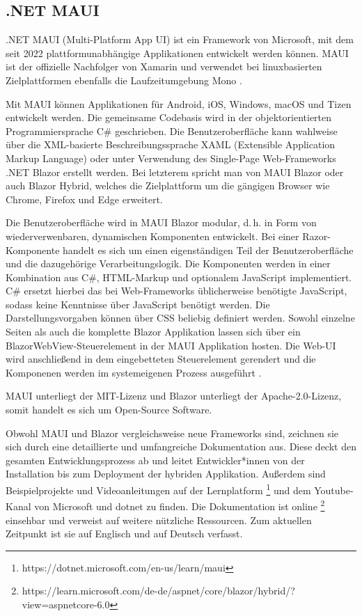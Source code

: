 \documentclass[]{lni}
\begin{document}
\subsection{.NET MAUI}\label{sec:MAUI}
.NET MAUI (Multi-Platform App UI) ist ein Framework von Microsoft, mit dem seit 2022 plattformunabhängige Applikationen entwickelt werden können. MAUI ist der offizielle Nachfolger von Xamarin und verwendet bei linuxbasierten Zielplattformen ebenfalls die Laufzeitumgebung Mono \cite{Davidbritch.04.12.2022c}. 

Mit MAUI können Applikationen für Android, iOS, Windows, macOS und Tizen entwickelt werden. Die gemeinsame Codebasis wird in der objektorientierten Programmiersprache C\# geschrieben. Die Benutzeroberfläche kann wahlweise über die XML-basierte Beschreibungssprache XAML (Extensible Application Markup Language) oder unter Verwendung des Single-Page Web-Frameworks .NET Blazor erstellt werden. Bei letzterem spricht man von MAUI Blazor oder auch Blazor Hybrid, welches die Zielplattform um die gängigen Browser wie Chrome, Firefox und Edge erweitert.

Die Benutzeroberfläche wird in MAUI Blazor modular, d.\,h. in Form von wiederverwenbaren, dynamischen Komponenten entwickelt. Bei einer Razor-Komponente handelt es sich um einen eigenständigen Teil der Benutzeroberfläche und die dazugehörige Verarbeitungslogik. Die Komponenten werden in einer Kombination aus C\#, HTML-Markup und optionalem JavaScript implementiert. C\# ersetzt hierbei das bei Web-Frameworks üblicherweise benötigte JavaScript, sodass keine Kenntnisse über JavaScript benötigt werden. Die Darstellungsvorgaben können über CSS beliebig definiert werden. Sowohl einzelne Seiten als auch die komplette Blazor Applikation lassen sich über ein BlazorWebView-Steuerelement in der MAUI Applikation hosten. Die Web-UI wird anschließend in dem eingebetteten Steuerelement gerendert und die Komponenen werden im systemeigenen Prozess ausgeführt \cite{Davidbritch.04.12.2022}.

MAUI unterliegt der MIT-Lizenz und Blazor unterliegt der Apache-2.0-Lizenz, somit handelt es sich um Open-Source Software.

Obwohl MAUI und Blazor vergleichsweise neue Frameworks sind, zeichnen sie sich durch eine detaillierte und umfangreiche Dokumentation aus. Diese deckt den gesamten Entwicklungsprozess ab und leitet Entwickler*innen von der Installation bis zum Deployment der hybriden Applikation. Außerdem sind Beispielprojekte und Videoanleitungen auf der Lernplatform \footnote{https://dotnet.microsoft.com/en-us/learn/maui} und dem Youtube-Kanal von Microsoft und dotnet zu finden. Die Dokumentation ist online \footnote{https://learn.microsoft.com/de-de/aspnet/core/blazor/hybrid/?view=aspnetcore-6.0} einsehbar und verweist auf weitere nützliche Ressourcen. Zum aktuellen Zeitpunkt ist sie auf Englisch und auf Deutsch verfasst. 
\end{document}
